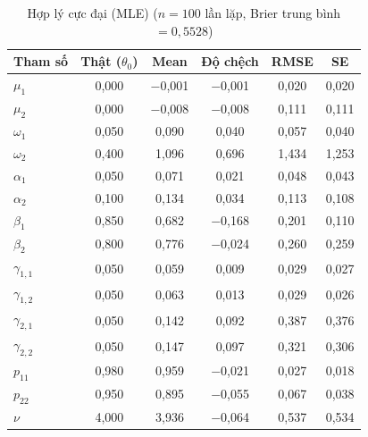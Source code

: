\documentclass[11pt,a4paper]{article}
\begin{document}
\begin{table}[H]\centering\scriptsize
\caption{Hợp lý cực đại (MLE) ($n=100$ lần lặp, Brier trung bình $=0,5528$)}
\begin{tabularx}{\textwidth}{l C C C C C}
\toprule
\textbf{Tham số} & \textbf{Thật ($\theta_0$)} & \textbf{Mean} & \textbf{Độ chệch} & \textbf{RMSE} & \textbf{SE} \\
\midrule
$\mu_1$ & 0,000 & $-$0,001 & $-$0,001 & 0,020 & 0,020 \\
$\mu_2$ & 0,000 & $-$0,008 & $-$0,008 & 0,111 & 0,111 \\
$\omega_1$ & 0,050 & 0,090 & 0,040 & 0,057 & 0,040 \\
$\omega_2$ & 0,400 & 1,096 & 0,696 & 1,434 & 1,253 \\
$\alpha_1$ & 0,050 & 0,071 & 0,021 & 0,048 & 0,043 \\
$\alpha_2$ & 0,100 & 0,134 & 0,034 & 0,113 & 0,108 \\
$\beta_1$ & 0,850 & 0,682 & $-$0,168 & 0,201 & 0,110 \\
$\beta_2$ & 0,800 & 0,776 & $-$0,024 & 0,260 & 0,259 \\
$\gamma_{1,1}$ & 0,050 & 0,059 & 0,009 & 0,029 & 0,027 \\
$\gamma_{1,2}$ & 0,050 & 0,063 & 0,013 & 0,029 & 0,026 \\
$\gamma_{2,1}$ & 0,050 & 0,142 & 0,092 & 0,387 & 0,376 \\
$\gamma_{2,2}$ & 0,050 & 0,147 & 0,097 & 0,321 & 0,306 \\
$p_{11}$ & 0,980 & 0,959 & $-$0,021 & 0,027 & 0,018 \\
$p_{22}$ & 0,950 & 0,895 & $-$0,055 & 0,067 & 0,038 \\
$\nu$ & 4,000 & 3,936 & $-$0,064 & 0,537 & 0,534 \\
\bottomrule
\end{tabularx}
\end{table}
\end{document}
